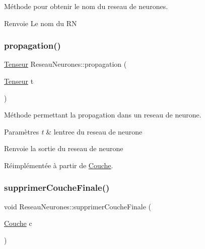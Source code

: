 Méthode pour obtenir le nom du reseau de neurones. 

\begin{DoxyReturn}{Renvoie}
Le nom du RN 
\end{DoxyReturn}
\mbox{\label{class_reseau_neurones_a7079f7694f0369187b8ff28cefcbc5eb}} 
\subsubsection{\texorpdfstring{propagation()}{propagation()}}
{\footnotesize\ttfamily \hyperlink{class_tenseur}{Tenseur} Reseau\+Neurones\+::propagation (\begin{DoxyParamCaption}\item[{\hyperlink{class_tenseur}{Tenseur}}]{t }\end{DoxyParamCaption})\hspace{0.3cm}{\ttfamily [virtual]}}



Méthode permettant la propagation dans un reseau de neurone. 


\begin{DoxyParams}{Paramètres}
{\em t} & l\textquotesingle{}entree du reseau de neurone \\
\hline
\end{DoxyParams}
\begin{DoxyReturn}{Renvoie}
la sortie du reseau de neurone 
\end{DoxyReturn}


Réimplémentée à partir de \hyperlink{class_couche_a1f0ed59e21020f5d4f37933af4d1b1e5}{Couche}.

\mbox{\label{class_reseau_neurones_a1451816837d4df8ad486775cc2f9730b}} 
\subsubsection{\texorpdfstring{supprimer\+Couche\+Finale()}{supprimerCoucheFinale()}}
{\footnotesize\ttfamily void Reseau\+Neurones\+::supprimer\+Couche\+Finale (\begin{DoxyParamCaption}\item[{\hyperlink{class_couche}{Couche}}]{c }\end{DoxyParamCaption})}



